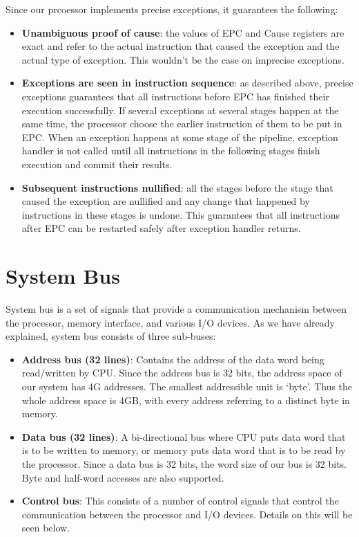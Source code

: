 \documentclass[oneside]{book}
\begin{document}
Since our prcoessor implements precise exceptions, it guarantees
the following:

\begin{itemize}

\item \textbf{Unambiguous proof of cause}: the values of EPC and
      Cause registers are exact and refer to the actual instruction
      that caused the exception and the actual type of exception.
      This wouldn't be the case on imprecise exceptions.

\item \textbf{Exceptions are seen in instruction sequence}:
       as described above, precise exceptions guarantees that
       all instructions before EPC has finished their execution
       successfully. If several exceptions at several stages happen
       at the same time, the processor choose the earlier instruction
       of them to be put in EPC. When an exception happens
       at some stage of the pipeline, exception handler is not
       called until all instructions in the following stages finish
       execution and commit their results.

\item \textbf{Subsequent instructions nullified}:
      all the stages before the stage that caused the exception
      are nullified and any change that happened by instructions
      in these stages is undone. This guarantees that all instructions
      after EPC can be restarted safely after exception handler returns.

\end{itemize}

\section{System Bus}

System bus is a set of signals that provide a communication mechanism
between the processor, memory interface, and various I/O devices. As
we have already explained, system bus consists of three sub-buses:

\begin{itemize}

\item \textbf{Address bus (32 lines)}: Contains the address
of the data word being read/written by CPU. Since the address bus
is 32 bits, the address space of our system has 4G addresses. The smallest
addressible unit is `byte'. Thus the whole address space is 4GB, with
every address referring to a distinct byte in memory.

\item \textbf{Data bus (32 lines)}: A bi-directional bus where CPU puts
data word that is to be written to memory, or memory puts data word that
is to be read by the processor. Since a data bus is 32 bits, the word size
of our bus is 32 bits. Byte and half-word accesses are also supported.

\item \textbf{Control bus}: This consists of a number of control signals
that control the communication between the processor and I/O devices. Details
on this will be seen below.

\end{itemize}
\end{document}
